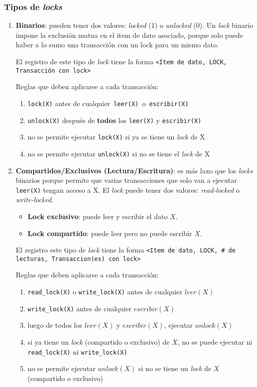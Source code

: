 \documentclass[a4paper, twoside]{article}
\begin{document}
\subsubsection{Tipos de \emph{locks}}
\begin{enumerate}
	\item \textbf{Binarios}: pueden tener dos valores: \emph{locked} (1) o \emph{unlocked} (0). Un \emph{lock} binario impone la exclusión mutua en el item de dato asociado, porque solo puede haber a lo sumo una transacción con un lock para un mismo dato.

	El registro de este tipo de \emph{lock} tiene la forma \texttt{<Item de dato, LOCK, Transacción con lock>}

	Reglas que deben aplicarse a cada transacción:
	\begin{enumerate}
		\item \texttt{lock(X)} antes de cualquier\texttt{ leer(X) }o\texttt{ escribir(X)}
		\item \texttt{unlock(X)} después de \textbf{todos} los \texttt{leer(X)} y \texttt{escribir(X)}
		\item no se permite ejecutar \texttt{lock(X)} si ya se tiene un \emph{lock} de X
		\item no se permite ejecutar \texttt{unlock(X)} si no se tiene el \emph{lock} de X
	\end{enumerate}

	\item \textbf{Compartidos/Exclusivos (Lectura/Escritura)}: es más laxo que los \emph{locks} binarios porque permite que varias transacciones que solo van a ejecutar \texttt{leer(X)} tengan acceso a X. El \emph{lock} puede tener dos valores: \emph{read-locked} o \emph{write-locked}.
	\begin{itemize}
		\item \textbf{Lock exclusivo}: puede leer y escribir el dato $X$.
		\item \textbf{Lock compartido}: puede leer pero no puede escribir $X$.
	\end{itemize}

	El registro este tipo de \emph{lock} tiene la forma \texttt{<Item de dato, LOCK, \# de lecturas, Transaccion(es) con lock>}

	Reglas que deben aplicarse a cada transacción:
	\begin{enumerate}
		\item \texttt{read\_lock(X)} o \texttt{write\_lock(X)} antes de cualquier $leer(X)$
		\item \texttt{write\_lock(X)} antes de cualquier $escribir(X)$
		\item luego de todos los $leer(X)$ y $escribir(X)$, ejecutar $unlock(X)$
		\item si ya tiene un \emph{lock} (compartido o exclusivo) de $X$, no se puede ejecutar ni \texttt{read\_lock(X)} ni \texttt{write\_lock(X)}
		\item no se permite ejecutar $unlock(X)$ si no se tiene un \emph{lock} de $X$ (compartido o exclusivo)
	\end{enumerate}
\end{enumerate}
\end{document}
